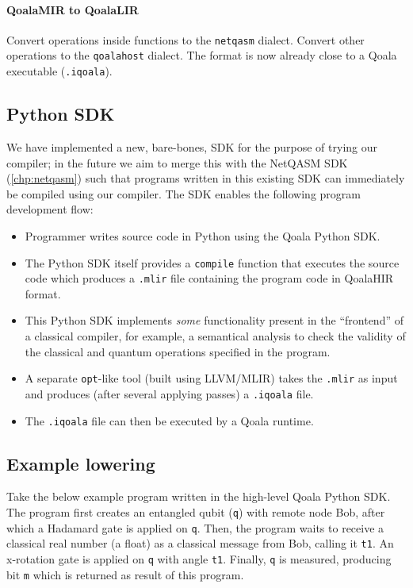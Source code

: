 \paragraph{QoalaMIR to QoalaLIR}
Convert operations inside functions to the \texttt{netqasm} dialect.
Convert other operations to the \texttt{qoalahost} dialect.
The format is now already close to a Qoala executable (\texttt{.iqoala}).

\subsection{Python SDK}
We have implemented a new, bare-bones, SDK for the purpose of trying our compiler; in the future we aim to merge this with the NetQASM SDK (\cref{chp:netqasm}) such that programs written in this existing SDK can immediately be compiled using our compiler.
The SDK enables the following program development flow:

\begin{itemize}
\item Programmer writes source code in Python using the Qoala Python SDK.
\item The Python SDK itself provides a \texttt{compile} function that executes the source code
  which produces a \texttt{.mlir} file containing the program code in QoalaHIR format.
\item This Python SDK implements \textit{some} functionality present in the ``frontend'' of a classical
  compiler, for example, a semantical analysis to check the validity of the classical and
  quantum operations specified in the program.
\item A separate \texttt{opt}-like tool (built using LLVM/MLIR) takes the \texttt{.mlir} as input and produces
  (after several applying passes) a \texttt{.iqoala} file.
\item The \texttt{.iqoala} file can then be executed by a Qoala runtime.
\end{itemize}


\subsection{Example lowering}

Take the below example program written in the high-level Qoala Python SDK.
The program first creates an entangled qubit (\texttt{q}) with remote node Bob, after which a Hadamard gate is applied on \texttt{q}.
Then, the program waits to receive a classical real number (a float) as a classical message from Bob, calling it \texttt{t1}.
An x-rotation gate is applied on \texttt{q} with angle \texttt{t1}.
Finally, \texttt{q} is measured, producing bit \texttt{m} which is returned as result of this program.
\newpage

